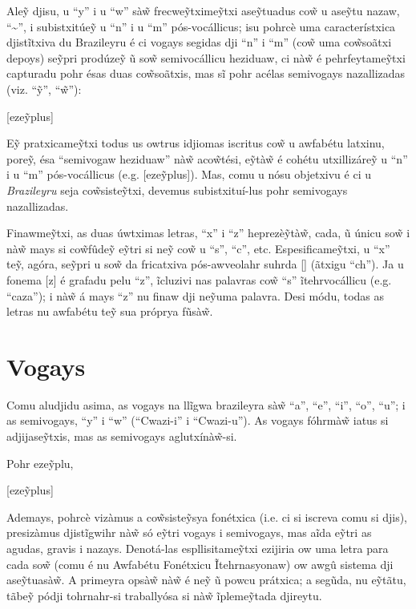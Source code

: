 \documentclass[12pt, a5paper, titlepage]{article}
\begin{document}
\begin{bilingualpages}
    Ale\~y djisu, u ``y'' i u ``w'' sà\~w frecwe\~ytxime\~ytxi ase\~ytuadus co\~w u
    ase\~ytu nazaw, ``\textasciitilde'', i subistxitúe\~y u ``n'' i u ``m''
    pós-vocállicus; isu pohrcè uma característxica djistĩtxiva du Brazileyru é ci
    vogays segidas dji ``n'' i ``m'' (co\~w uma co\~wsoãtxi depoys) se\~ypri
    prodúze\~y ũ so\~w semivocállicu heziduaw, ci nà\~w é pehrfeytame\~ytxi
    capturadu pohr ésas duas co\~wsoãtxis, mas sĩ pohr acélas semivogays
    nazallizadas (viz. ``\~y'', ``\~w''):

    [eze\~yplus]

    E\~y pratxicame\~ytxi todus us owtrus idjiomas iscritus co\~w u awfabétu
    latxinu, pore\~y, ésa ``semivogaw heziduaw'' nà\~w aco\~wtési, e\~ytà\~w é
    cohétu utxillizáre\~y u ``n'' i u ``m'' pós-vocállicus (e.g. [eze\~yplus]).
    Mas, comu u nósu objetxivu é ci u \textit{Brazileyru} seja co\~wsiste\~ytxi,
    devemus subistxituí-lus pohr semivogays nazallizadas.

    Finawme\~ytxi, as duas úwtximas letras, ``x'' i ``z'' heprezè\~ytà\~w, cada, ũ
    únicu so\~w i nà\~w mays si co\~wfûde\~y e\~ytri si ne\~y co\~w u ``s'', ``c'',
    etc. Espesificame\~ytxi, u ``x'' te\~y, agóra, se\~ypri u so\~w da fricatxiva
    pós-awveolahr suhrda [\textesh] (ãtxigu ``ch''). Ja u fonema [z] é grafadu pelu
    ``z'', ĩcluzivi nas palavras co\~w ``s'' ĩtehrvocállicu (e.g. ``caza''); i
    nà\~w á mays ``z'' nu finaw dji ne\~yuma palavra. Desi módu, todas as letras nu
    awfabétu te\~y sua próprya fũsà\~w.

    \section{Vogays}
    Comu aludjidu asima, as vogays na llĩgwa brazileyra sà\~w ``a'', ``e'', ``i'',
    ``o'', ``u''; i as semivogays, ``y'' i ``w'' (``Cwazi-i'' i ``Cwazi-u''). As
    vogays fóhrmà\~w iatus si adjijase\~ytxis, mas as semivogays aglutxínà\~w-si.

    Pohr eze\~yplu,

    [eze\~yplus]

    Ademays, pohrcè vizàmus a co\~wsiste\~ysya fonétxica (i.e. ci si iscreva comu
    si djis), presizàmus djistĩgwihr nà\~w só e\~ytri vogays i semivogays, mas aĩda
    e\~ytri as agudas, gravis i nazays. Denotá-las espllisitame\~ytxi ezijiria ow
    uma letra para cada so\~w (comu é nu Awfabétu Fonétxicu Ĩtehrnasyonaw) ow awgû
    sistema dji ase\~ytuasà\~w. A primeyra opsà\~w nà\~w é ne\~y ũ powcu prátxica;
    a segũda, nu e\~ytãtu, tãbe\~y pódji tohrnahr-si traballyósa si nà\~w
    ĩpleme\~ytada djireytu.


\end{bilingualpages}
\end{document}
